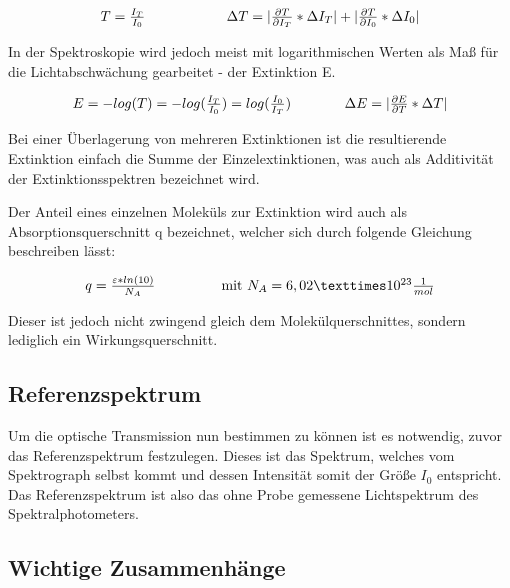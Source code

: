 \documentclass[12pt,a4paper,twoside]{article}
\begin{document}
\begin{equation}
    \label{eq:Transmission}
    \centerline{$T=\frac{I_{T}}{I_{0}}$ \\ $\Delta T = \vert \frac{\partial T}{\partial I_{T}} * \Delta I_{T} \vert + \vert \frac{\partial T}{\partial I_{0}} * \Delta I_{0} \vert $}
\end{equation}

\noindent
In der Spektroskopie wird jedoch meist mit logarithmischen Werten als Maß für die Lichtabschwächung gearbeitet - der Extinktion E.

\begin{equation}
    \label{eq:Extinktion}
    \centerline{$E=-log(T)=-log(\frac{I_{T}}{I_{0}})=log(\frac{I_{0}}{I_{T}})$ \\ $\Delta E = \vert \frac{\partial E}{\partial T} * \Delta T \vert$}
\end{equation}

\noindent
Bei einer Überlagerung von mehreren Extinktionen ist die resultierende Extinktion einfach die Summe der Einzelextinktionen, was auch als Additivität der Extinktionsspektren bezeichnet wird. \newline

\noindent
Der Anteil eines einzelnen Moleküls zur Extinktion wird auch als Absorptionsquerschnitt q bezeichnet, welcher sich durch folgende Gleichung beschreiben lässt:

\begin{equation}
    \label{eq:Absorptionsquerschnitt}
    \centerline{$q=\frac{\varepsilon *ln(10)}{N_{A}}$ \\ mit $N_{A}=6,02 × 10^{23} \frac{1}{mol}$}
\end{equation}

\noindent
Dieser ist jedoch nicht zwingend gleich dem Molekülquerschnittes, sondern lediglich ein Wirkungsquerschnitt.

\subsection{Referenzspektrum}

Um die optische Transmission nun bestimmen zu können ist es notwendig, zuvor das Referenzspektrum festzulegen. Dieses ist das Spektrum, welches vom Spektrograph selbst kommt und dessen Intensität somit der Größe $I_{0}$ entspricht.
Das Referenzspektrum ist also das ohne Probe gemessene Lichtspektrum des Spektralphotometers. 

\subsection{Wichtige Zusammenhänge}
\end{document}
